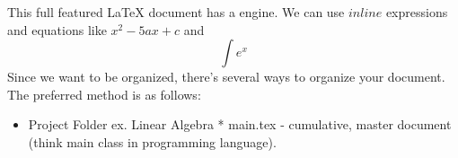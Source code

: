 \markdownRendererUlBegin
\markdownRendererUlItem This full featured LaTeX document has a  engine.\markdownRendererUlItemEnd 
\markdownRendererUlItem We can use $inline$ expressions and equations like $x^2-5ax+c$ and $$\int e^x$$\markdownRendererUlItemEnd 
\markdownRendererUlEnd \markdownRendererInterblockSeparator
{}\markdownRendererInterblockSeparator
{}Since we want to be organized, there's several ways to organize your document. The preferred method is as follows:\markdownRendererInterblockSeparator
{}\begin{itemize} \item Project Folder ex. Linear Algebra * main.tex - cumulative, master document (think main class in programming language).\markdownRendererInterblockSeparator
{}\end{itemize}\relax